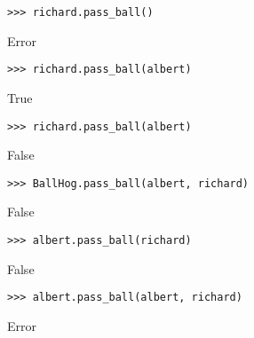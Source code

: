 \begin{blocksection}
\begin{lstlisting}
>>> richard.pass_ball()
\end{lstlisting}
\begin{solution}[.2in]
Error
\end{solution}

\begin{lstlisting}
>>> richard.pass_ball(albert)
\end{lstlisting}
\begin{solution}[.2in]
True
\end{solution}

\begin{lstlisting}
>>> richard.pass_ball(albert)
\end{lstlisting}
\begin{solution}[.2in]
False
\end{solution}

\begin{lstlisting}
>>> BallHog.pass_ball(albert, richard)
\end{lstlisting}
\begin{solution}[.2in]
False
\end{solution}

\begin{lstlisting}
>>> albert.pass_ball(richard)
\end{lstlisting}
\begin{solution}[.2in]
False
\end{solution}

\begin{lstlisting}
>>> albert.pass_ball(albert, richard)
\end{lstlisting}
\begin{solution}[.2in]
Error
\end{solution}
\end{blocksection}
